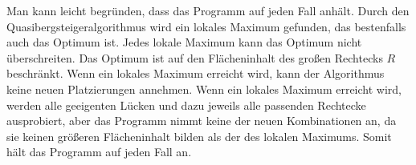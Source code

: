 Man kann leicht begründen, dass das Programm auf jeden Fall anhält.
Durch den Quasibergsteigeralgorithmus wird ein lokales Maximum gefunden, das bestenfalls auch
das Optimum ist. 
Jedes lokale Maximum kann das Optimum nicht überschreiten.
Das Optimum ist auf den Flächeninhalt des großen Rechtecks $R$ beschränkt.
Wenn ein lokales Maximum erreicht wird, kann der Algorithmus keine neuen Platzierungen
annehmen. 
Wenn ein lokales Maximum erreicht wird, werden alle geeigenten Lücken und dazu jeweils alle 
passenden Rechtecke ausprobiert, aber das Programm nimmt keine der neuen Kombinationen an,
da sie keinen größeren Flächeninhalt bilden als der des lokalen Maximums.
Somit hält das Programm auf jeden Fall an.
 












